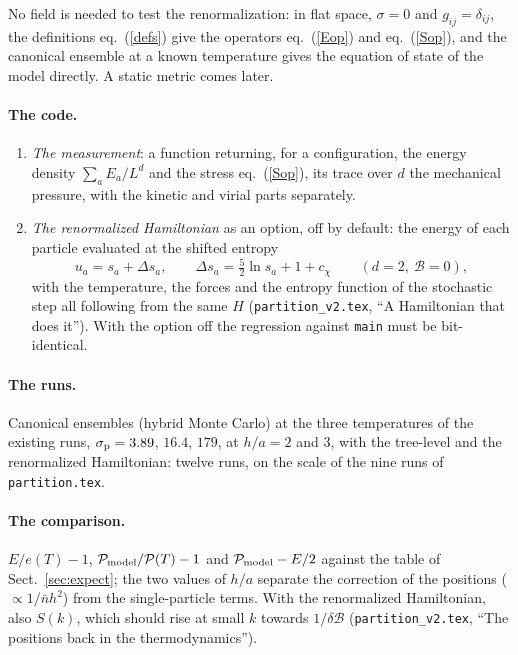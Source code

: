 \documentclass[11pt,aps,preprint,nofootinbib,superscriptaddress,tightenlines]{revtex4-2}
\newcommand{\klab}{\mathcal B}
\def\pr{{\mathcal P}}
\def\er{e}
\def\st{\begin{equation}}
\def\stp{\end{equation}}
\def\Eq#1{eq.~(\ref{#1})}
\def\Sect#1{Sect.~\ref{#1}}
\let\oldparagraph\paragraph
\renewcommand{\paragraph}{\par\bigskip\oldparagraph}
\begin{document}
No field is needed to test the renormalization: in flat space, $\sigma=0$ and $g_{ij}=\delta_{ij}$, the definitions \Eq{defs} give the operators \Eq{Eop} and \Eq{Sop}, and
the canonical ensemble at a known temperature gives the equation of state of the model directly.  A static metric comes later.

\paragraph{The code.}
\begin{enumerate}
\item \emph{The measurement}: a function returning, for a configuration, the energy density $\sum_aE_a/L^d$ and the stress \Eq{Sop}, its trace over $d$ the mechanical pressure,
  with the kinetic and virial parts separately.
\item \emph{The renormalized Hamiltonian} as an option, off by default: the energy of each particle evaluated at the shifted entropy
  \st
  u_a=s_a+\Delta s_a,\qquad \Delta s_a=\tfrac52\ln s_a+1+c_\chi\qquad(d=2,\ \klab=0),
  \stp
  with the temperature, the forces and the entropy function of the stochastic step all following from the same $H$ (\nolinkurl{partition_v2.tex}, ``A Hamiltonian that
  does it'').  With the option off the regression against \texttt{main} must be bit-identical.
\end{enumerate}

\paragraph{The runs.}  Canonical ensembles (hybrid Monte Carlo) at the three temperatures of the existing runs, $\sigma_{\rm p}=3.89$, $16.4$, $179$, at $h/a=2$ and $3$, with
the tree-level and the renormalized Hamiltonian: twelve runs, on the scale of the nine runs of \texttt{partition.tex}.

\paragraph{The comparison.}  $E/\er(T)-1$, $\pr_{\rm model}/\pr(T)-1$ and $\pr_{\rm model}-E/2$ against the table of \Sect{sec:expect}; the two values of $h/a$ separate the
correction of the positions ($\propto1/\bar nh^2$) from the single-particle terms.  With the renormalized Hamiltonian, also $S(k)$, which should rise at small $k$ towards
$1/\delta\klab$ (\nolinkurl{partition_v2.tex}, ``The positions back in the thermodynamics'').
\end{document}
